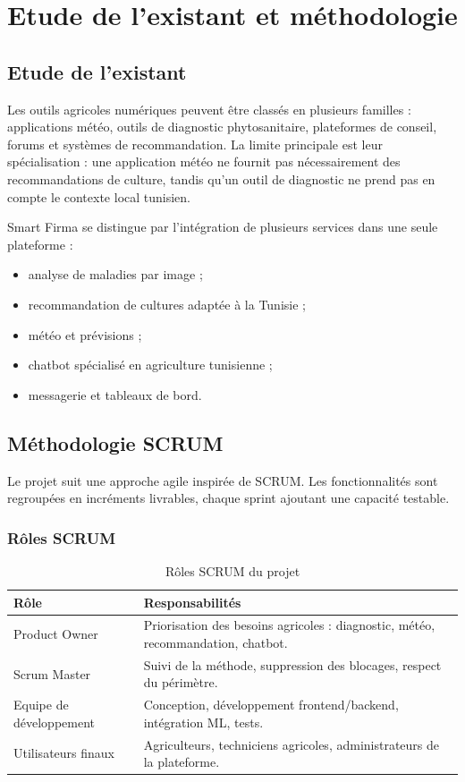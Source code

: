 \documentclass[12pt,a4paper]{report}
\begin{document}
\chapter{Etude de l'existant et méthodologie}

\section{Etude de l'existant}
Les outils agricoles numériques peuvent être classés en plusieurs familles : applications météo, outils de diagnostic phytosanitaire, plateformes de conseil, forums et systèmes de recommandation. La limite principale est leur spécialisation : une application météo ne fournit pas nécessairement des recommandations de culture, tandis qu'un outil de diagnostic ne prend pas en compte le contexte local tunisien.

Smart Firma se distingue par l'intégration de plusieurs services dans une seule plateforme :
\begin{itemize}[noitemsep]
  \item analyse de maladies par image ;
  \item recommandation de cultures adaptée à la Tunisie ;
  \item météo et prévisions ;
  \item chatbot spécialisé en agriculture tunisienne ;
  \item messagerie et tableaux de bord.
\end{itemize}

\section{Méthodologie SCRUM}
Le projet suit une approche agile inspirée de SCRUM. Les fonctionnalités sont regroupées en incréments livrables, chaque sprint ajoutant une capacité testable.

\subsection{Rôles SCRUM}
\begin{table}[H]
\centering
\caption{Rôles SCRUM du projet}
\begin{tabular}{p{4cm}p{10cm}}
\toprule
\textbf{Rôle} & \textbf{Responsabilités} \\
\midrule
Product Owner & Priorisation des besoins agricoles : diagnostic, météo, recommandation, chatbot. \\
Scrum Master & Suivi de la méthode, suppression des blocages, respect du périmètre. \\
Equipe de développement & Conception, développement frontend/backend, intégration ML, tests. \\
Utilisateurs finaux & Agriculteurs, techniciens agricoles, administrateurs de la plateforme. \\
\bottomrule
\end{tabular}
\end{table}
\end{document}
